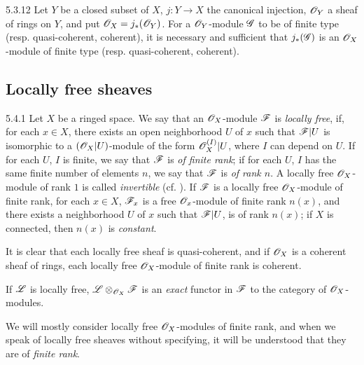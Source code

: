 \begin{env}{5.3.12}
\label{env-0.5.3.12}
Let $Y$ be a closed subset of $X$, $j:Y\to X$ the canonical injection, $\mathscr{O}_Y$ a sheaf of
rings on $Y$, and put $\mathscr{O}_X=j_*(\mathscr{O}_Y)$. For a $\mathscr{O}_Y$-module $\mathscr{G}$ to be of finite type
(resp. quasi-coherent, coherent), it is necessary and sufficient that $j_*(\mathscr{G})$ is an
$\mathscr{O}_X$-module of finite type (resp. quasi-coherent, coherent).
\end{env}

\subsection{Locally free sheaves}
\label{0-prelim-5.4}

\begin{env}{5.4.1}
\label{env-0.5.4.1}
Let $X$ be a ringed space. We say that an $\mathscr{O}_X$-module $\mathscr{F}$ is \emph{locally free}, if,
for each $x\in X$, there exists an open neighborhood $U$ of $x$ such that $\mathscr{F}|U$ is
isomorphic to a $(\mathscr{O}_X|U)$-module of the form $\mathscr{O}_X^{(I)}|U$, where $I$ can depend on $U$.
If for each $U$, $I$ is finite, we say that $\mathscr{F}$ is \emph{of finite rank}; if for each
$U$, $I$ has the same finite number of elements $n$, we say that $\mathscr{F}$ is \emph{of rank
$n$}. A locally free $\mathscr{O}_X$-module of rank $1$ is called \emph{invertible}
(cf. ). If $\mathscr{F}$ is a locally free $\mathscr{O}_X$-module of finite rank, for
each $x\in X$, $\mathscr{F}_x$ is a free $\mathscr{O}_x$-module of finite rank $n(x)$, and there exists a
neighborhood $U$ of $x$ such that $\mathscr{F}|U$, is of rank $n(x)$; if $X$ is connected, then
$n(x)$ is \emph{constant}.

It is clear that each locally free sheaf is quasi-coherent, and if $\mathscr{O}_X$ is a coherent
sheaf of rings, each locally free $\mathscr{O}_X$-module of finite rank is coherent.

If $\mathscr{L}$ is locally free, $\mathscr{L}\otimes_{\mathscr{O}_X}\mathscr{F}$ is an \emph{exact} functor in
$\mathscr{F}$ to the category of $\mathscr{O}_X$-modules.

We will mostly consider locally free $\mathscr{O}_X$-modules of finite rank,
and when we speak of locally free sheaves without specifying, it will be understood that
they are of \emph{finite rank}.
\end{env}

